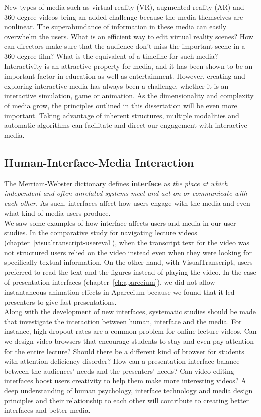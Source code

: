 New types of media such as virtual reality (VR), augmented reality (AR) and 360-degree videos bring an added challenge because the media themselves are nonlinear. The superabundance of information in these media can easily overwhelm the users. What is an efficient way to edit virtual reality scenes? How can directors make sure that the audience don't miss the important scene in a 360-degree film? What is the equivalent of a timeline for such media? \\

Interactivity is an attractive property for media, and it has been shown to be an important factor in education as well as entertainment. However, creating and exploring interactive media has always been a challenge, whether it is an interactive simulation, game or animation. As the dimensionality and complexity of media grow, the principles outlined in this dissertation will be even more important. Taking advantage of inherent structures, multiple modalities and automatic algorithms can facilitate and direct our engagement with interactive media.  

\subsection{Human-Interface-Media Interaction}
The Merriam-Webster dictionary defines \textbf{interface} as \emph{the place at which independent and often unrelated systems meet and act on or communicate with each other.} As such, interfaces affect how users engage with the media and even what kind of media users produce.\\

We saw some examples of how interface affects users and media in our user studies. In the comparative study for navigating lecture videos (chapter~\ref{visualtranscript-usereval}), when the transcript text for the video was not structured users relied on the video instead even when they were looking for specifically textual information. On the other hand, with VisualTranscript, users preferred to read the text and the figures instead of playing the video. In the case of presentation interfaces (chapter~\ref{ch:aparecium}), we did not allow instantaneous animation effects in Aparecium because we found that it led presenters to give fast presentations.\\

Along with the development of new interfaces, systematic studies should be made that investigate the interaction between human, interface and the media. For instance, high dropout rates are a common problem for online lecture videos. Can we design video browsers that encourage students to stay and even pay attention for the entire lecture? Should there be a different kind of browser for students with attention deficiency disorder? How can a presentation interface balance between the audiences' needs and the presenters' needs? Can video editing interfaces boost users creativity to help them make more interesting videos? A deep understanding of human psychology, interface technology and media design principles and their relationship to each other will contribute to creating better interfaces and better media. 